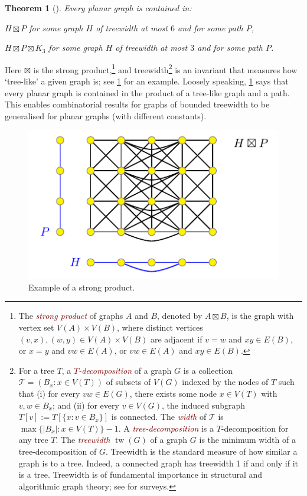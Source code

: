 \documentclass{patmorin}
\theoremstyle{plain}
\newtheorem{thm}{Theorem}
\theoremstyle{definition}
\newcommand{\defin}[1]{\textcolor{Maroon}{\emph{#1}}}
\DeclareMathOperator{\tw}{tw}
\begin{document}
\begin{thm}[\citep{DJMMUW20,UWY22}]
\label{PlanarProduct}
Every planar graph is contained in:
\begin{compactenum}[(a)]
  \item $H\boxtimes P$ for some graph $H$ of treewidth at most $6$ and for some path $P$,
  \item $H\boxtimes P \boxtimes K_3$ for some graph $H$ of treewidth at most $3$ and for some path $P$.
\end{compactenum}
\end{thm}

Here $\boxtimes$ is the strong product,\!\footnote{The \defin{strong product} of graphs $A$ and $B$, denoted by $A\boxtimes B$, is the graph with vertex set $V(A)\times V(B)$, where distinct vertices $(v,x),(w,y)\in V(A)\times V(B)$ are adjacent if
  $v=w$ and $xy\in E(B)$, or
  $x=y$ and $vw\in E(A)$, or
  $vw\in E(A)$ and $xy\in E(B)$.}
and treewidth\footnote{For a tree $T$, a \defin{$T$-decomposition} of a graph $G$ is a collection $\mathcal{T}=(B_x:x\in V(T))$ of subsets of $V(G)$ indexed by the nodes of $T$ such that
(i) for every $vw\in E(G)$, there exists some node $x\in V(T)$ with $v,w\in B_x$; and
(ii) for every $v\in V(G)$, the induced subgraph $T[v] := T[\{x: v\in B_x\}]$ is connected. The \defin{width} of $\mathcal{T}$ is $\max\{|B_x|:x\in V(T)\}-1$.  A \defin{tree-decomposition} is a $T$-decomposition for any tree $T$. The \defin{treewidth} $\tw(G)$ of a graph $G$ is the minimum width of a tree-decomposition of $G$.  Treewidth is the standard measure of how similar a graph is to a tree. Indeed, a connected graph has treewidth 1 if and only if it is a tree. Treewidth is of fundamental importance in structural and algorithmic graph theory; see \citep{Reed03,HW17,Bodlaender-TCS98} for surveys.} is an invariant that measures how `tree-like' a given graph is; see \cref{ProductExample} for an example. Loosely speaking, \cref{PlanarProduct} says that every planar graph is contained in the product of a tree-like graph and a path. This enables combinatorial results for graphs of bounded treewidth to be generalised for planar graphs (with different constants).

\begin{figure}[!h]
\centering
\includegraphics{ProductExample}
\caption{Example of a strong product.
\label{ProductExample}}
\end{figure}
\end{document}
